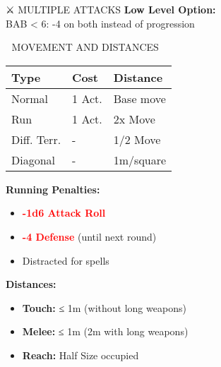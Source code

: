 \documentclass[10pt,a4paper,landscape]{article}
\newcommand{\critical}[1]{\textcolor{red}{\textbf{#1}}}
\begin{document}
\begin{multicols}{4}
\begin{mainsection}{⚔️ MULTIPLE ATTACKS}
			\textbf{Low Level Option:}\\
			BAB < 6: -4 on both instead of progression
		\end{mainsection}

		\begin{mainsection}{🏃 MOVEMENT AND DISTANCES}
			\begin{tabular}{@{}p{2cm}p{1cm}p{2.5cm}@{}}
				\toprule
				\textbf{Type} & \textbf{Cost} & \textbf{Distance} \\
				\midrule
				Normal & 1 Act. & Base move \\
				Run & 1 Act. & 2x Move \\
				Diff. Terr. & - & 1/2 Move \\
				Diagonal & - & 1m/square \\
				\bottomrule
			\end{tabular}

			\textbf{Running Penalties:}
			\begin{itemize}[noitemsep,leftmargin=8pt]
				\item \critical{-1d6 Attack Roll}
				\item \critical{-4 Defense} (until next round)
				\item Distracted for spells
			\end{itemize}

			\textbf{Distances:}
			\begin{itemize}[noitemsep,leftmargin=8pt]
				\item \textbf{Touch:} ≤ 1m (without long weapons)
				\item \textbf{Melee:} ≤ 1m (2m with long weapons)
				\item \textbf{Reach:} Half Size occupied
			\end{itemize}
		\end{mainsection}

		\columnbreak


\end{multicols}
\end{document}
